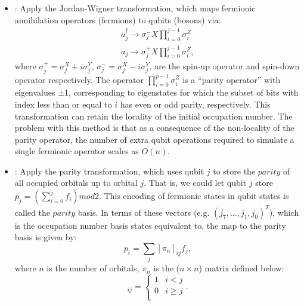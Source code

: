 \begin{itemize}
    \item \methodjordanwigner: Apply the Jordan-Wigner transformation, which maps fermionic annihilation operators (fermions) to qubits (bosons) via:
          \begin{equation}
              \begin{split}
                  a_j^{\dagger} \to {\sigma}_j^{-} X \prod_{i=0}^{j-1} {\sigma}^Z_i \\
                  a_j \to {\sigma}_j^{+} X \prod_{i=0}^{j-1} {\sigma}^Z_i,
              \end{split}
          \end{equation}
          where ${\sigma}_j^{+} = {\sigma}_j^X+i{\sigma}_j^Y$, ${\sigma}_j^{-} = {\sigma}_j^X-i{\sigma}_j^Y$, are the spin-up operator and spin-down operator respectively. The operator $\prod_{i=0}^{p-1} {{\sigma}^Z_i}$ is a “parity operator” with eigenvalues ±1, corresponding to eigenstates for which the subset of bits with index less than or equal to $i$ has even or odd parity, respectively. This transformation can retain the locality of the initial occupation number. The problem with this method is that as a consequence of the non-locality of the parity operator, the number of extra qubit operations required to simulate a single fermionic operator scales as $O(n)$.
    \item \methodparity: Apply the parity transformation, which uses qubit $j$ to store the $parity$ of all occupied orbitals up to orbital $j$. That is, we could let qubit $j$ store $p_j = (\sum_{i=0}^j f_i) mod 2$. This encoding of fermionic states in qubit states is called the $parity$ basis. In terms of these vectors (e.g. $(j_7,...,j_1,j_0)^T$), which is the occupation number basis states equivalent to, the map to the parity basis is given by:
          \begin{equation}
              p_i = \sum_j {[\pi_n]_{ij} f_j},
          \end{equation}
          where $n$ is the number of orbitals, $\pi_n$ is the ($n \times n$) matrix defined below:
          \begin{equation}
              [\pi_n]_{ij} =
              \begin{cases}
                  1 & i<j     \\
                  0 & i\geq j \\
              \end{cases}.
          \end{equation}

\end{itemize}
